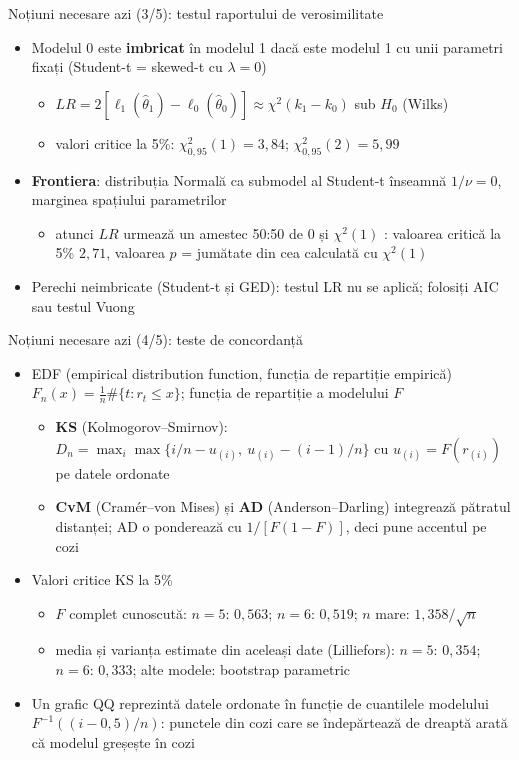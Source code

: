 \begin{frame}{Noțiuni necesare azi (3/5): testul raportului de verosimilitate}
\itemsize{\small}
\begin{itemize}
    \item Modelul 0 este \textbf{imbricat} în modelul 1 dacă este modelul 1 cu unii parametri fixați (Student-t = skewed-t cu $\lambda = 0$)
    \begin{itemize}
        \item $LR = 2[\ell_1(\hat\theta_1) - \ell_0(\hat\theta_0)] \approx \chi^2(k_1 - k_0)$ sub $H_0$ (Wilks)
        \item valori critice la 5\%: $\chi^2_{0{,}95}(1) = 3{,}84$; $\chi^2_{0{,}95}(2) = 5{,}99$
    \end{itemize}
    \item \textbf{Frontiera}: distribuția Normală ca submodel al Student-t înseamnă $1/\nu = 0$, marginea spațiului parametrilor
    \begin{itemize}
        \item atunci $LR$ urmează un amestec 50:50 de 0 și $\chi^2(1)$ : valoarea critică la 5\% $2{,}71$, valoarea $p$ = jumătate din cea calculată cu $\chi^2(1)$
    \end{itemize}
    \item Perechi neimbricate (Student-t și GED): testul LR nu se aplică; folosiți AIC sau testul Vuong
\end{itemize}
\end{frame}

\begin{frame}{Noțiuni necesare azi (4/5): teste de concordanță}
\itemsize{\small}
\begin{itemize}
    \item EDF (empirical distribution function, funcția de repartiție empirică) $F_n(x) = \frac{1}{n}\#\{t: r_t \le x\}$; funcția de repartiție a modelului $F$
    \begin{itemize}
        \item \textbf{KS} (Kolmogorov--Smirnov): $D_n = \max_i \max\{i/n - u_{(i)},\ u_{(i)} - (i-1)/n\}$ cu $u_{(i)} = F(r_{(i)})$ pe datele ordonate
        \item \textbf{CvM} (Cramér--von Mises) și \textbf{AD} (Anderson--Darling) integrează pătratul distanței; AD o ponderează cu $1/[F(1-F)]$, deci pune accentul pe cozi
    \end{itemize}
    \item Valori critice KS la 5\%
    \begin{itemize}
        \item $F$ complet cunoscută: $n = 5$: $0{,}563$; $n = 6$: $0{,}519$; $n$ mare: $1{,}358/\sqrt{n}$
        \item media și varianța estimate din aceleași date (Lilliefors): $n = 5$: $0{,}354$; $n = 6$: $0{,}333$; alte modele: bootstrap parametric
    \end{itemize}
    \item Un grafic QQ reprezintă datele ordonate în funcție de cuantilele modelului $F^{-1}((i - 0{,}5)/n)$: punctele din cozi care se îndepărtează de dreaptă arată că modelul greșește în cozi
\end{itemize}
\end{frame}


